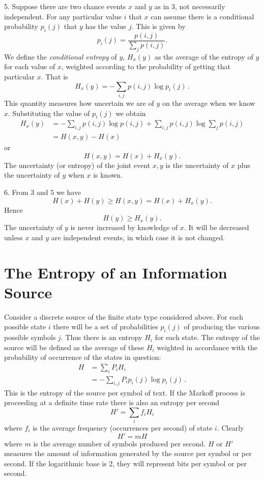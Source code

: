 5. Suppose there are two chance events $x$ and $y$ as in 3, not
necessarily independent.  For any particular value $i$ that $x$ can assume
there is a conditional probability $p_i(j)$ that $y$ has the value $j$.
This is given by
$$
p_i(j)=\frac{p(i,j)}{\sum_j p(i,j)}.
$$
We define the \emph{conditional entropy} of $y$, $H_x(y)$ as the average
of the entropy of $y$ for each value of $x$, weighted according to the
probability of getting that particular $x$.  That is
$$
H_x(y) = - \sum_{i,j} p(i,j) \log p_i(j) \, .
$$
This quantity measures how uncertain we are of $y$ on the average when
we know $x$.  Substituting the value of $p_i (j)$ we obtain
\begin{align*}
H_x(y) &= - \sum_{i,j} p(i,j) \log p(i,j)
	 + \sum_{i,j} p(i,j) \log \sum_j p(i,j) \\
&= H(x,y) - H(x)
\end{align*}
or
$$
H(x,y) = H(x) + H_x (y).
$$
The uncertainty (or entropy) of the joint event $x,y$ is the uncertainty
of $x$ plus the uncertainty of $y$ when $x$ is known.

6. From 3 and 5 we have
$$
H(x) + H(y) \ge H(x,y) = H(x) + H_x(y).
$$
Hence
$$
H(y) \ge H_x (y).
$$
The uncertainty of $y$ is never increased by knowledge of $x$.  It will
be decreased unless $x$ and $y$ are independent events, in which case
it is not changed.

\section{The Entropy of an Information Source}

Consider a discrete source of the finite state type considered above.
For each possible state $i$ there will be a set of probabilities $p_i
(j)$ of producing the various possible symbols $j$.  Thus there is an
entropy $H_i$ for each state.  The entropy of the source will be defined
as the average of these $H_i$ weighted in accordance with the probability
of occurrence of the states in question:
\begin{align*}
H &= \sum_i P_i H_i \\
  &= - \sum_{i,j} P_i p_i (j) \log p_i (j) \, .
\end{align*}
This is the entropy of the source per symbol of text.  If the Markoff
process is proceeding at a definite time rate there is also an entropy
per second
$$
H' = \sum_i f_i H_i
$$
where $f_i$ is the average frequency (occurrences per second) of
state $i$.  Clearly
$$
H' = mH
$$
where $m$ is the average number of symbols produced per second.  $H$
or $H'$ measures the amount of information generated by the source per
symbol or per second.  If the logarithmic base is 2, they will represent
bits per symbol or per second.

